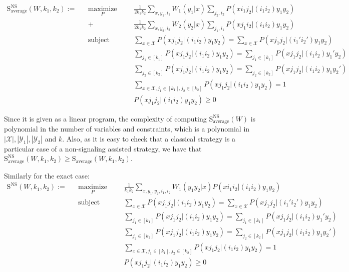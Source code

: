 \documentclass[11pt]{article}
\theoremstyle{definition}
\theoremstyle{remark}
\DeclareMathOperator{\maxi}{\text{maximize}}
\DeclareMathOperator{\st}{\text{subject to}}
\begin{document}
\begin{equation}
  \begin{aligned}
    \mathrm{S}_{\text{average}}^{\mathrm{NS}}(W,k_1,k_2) := &&\underset{P}{\maxi} &&& \frac{1}{2k_1k_2}\sum_{x,y_1,i_1} W_1(y_1|x)\sum_{j_2,i_2} P(xi_1j_2|(i_1i_2)y_1y_2)\\
    &&+&&& \frac{1}{2k_1k_2}\sum_{x,y_2,i_2} W_2(y_2|x) \sum_{j_1,i_1} P(xj_1i_2|(i_1i_2)y_1y_2)\\
    &&\st &&& \sum_{x \in \mathcal{X}} P(xj_1j_2|(i_1i_2)y_1y_2) = \sum_{x \in \mathcal{X}} P(xj_1j_2|(i_1'i_2')y_1y_2)\\
    &&&&& \sum_{j_1 \in [k_1]} P(xj_1j_2|(i_1i_2)y_1y_2) = \sum_{j_1 \in [k_1]} P(xj_1j_2|(i_1i_2)y_1'y_2)\\
    &&&&& \sum_{j_2 \in [k_2]} P(xj_1j_2|(i_1i_2)y_1y_2) = \sum_{j_2 \in [k_2]} P(xj_1j_2|(i_1i_2)y_1y_2')\\
    &&&&& \sum_{x \in \mathcal{X}, j_1 \in [k_1], j_2 \in [k_2]} P(xj_1j_2|(i_1i_2)y_1y_2) = 1\\
    &&&&& P(xj_1j_2|(i_1i_2)y_1y_2) \geq 0
  \end{aligned}
\end{equation}

Since it is given as a linear program, the complexity of computing $\mathrm{S}_{\text{average}}^{\mathrm{NS}}(W)$ is polynomial in the number of variables and constraints, which is a polynomial in $|\mathcal{X}|,|\mathcal{Y}_1|,|\mathcal{Y}_2|$ and $k$. Also, as it is easy to check that a classical strategy is a particular case of a non-signaling assisted strategy, we have that $\mathrm{S}_{\text{average}}^{\mathrm{NS}}(W,k_1,k_2) \geq \mathrm{S}_{\text{average}}(W,k_1,k_2)$.

Similarly for the exact case:
\begin{equation}
  \begin{aligned}
    \mathrm{S}^{\mathrm{NS}}(W,k_1,k_2) := &&\underset{P}{\maxi} &&& \frac{1}{k_1k_2}\sum_{x,y_1,y_2,i_1,i_2} W_1(y_1y_2|x)P(xi_1i_2|(i_1i_2)y_1y_2)\\
    &&\st &&& \sum_{x \in \mathcal{X}} P(xj_1j_2|(i_1i_2)y_1y_2) = \sum_{x \in \mathcal{X}} P(xj_1j_2|(i_1'i_2')y_1y_2)\\
    &&&&& \sum_{j_1 \in [k_1]} P(xj_1j_2|(i_1i_2)y_1y_2) = \sum_{j_1 \in [k_1]} P(xj_1j_2|(i_1i_2)y_1'y_2)\\
    &&&&& \sum_{j_2 \in [k_2]} P(xj_1j_2|(i_1i_2)y_1y_2) = \sum_{j_2 \in [k_2]} P(xj_1j_2|(i_1i_2)y_1y_2')\\
    &&&&& \sum_{x \in \mathcal{X}, j_1 \in [k_1], j_2 \in [k_2]} P(xj_1j_2|(i_1i_2)y_1y_2) = 1\\
    &&&&& P(xj_1j_2|(i_1i_2)y_1y_2) \geq 0
  \end{aligned}
\end{equation}
\end{document}
